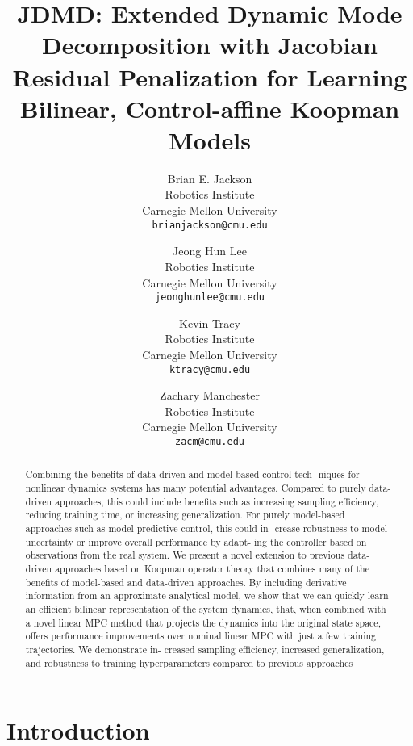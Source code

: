 \documentclass{article}
\title{JDMD: Extended Dynamic Mode Decomposition with Jacobian Residual Penalization
for Learning Bilinear, Control-affine Koopman Models}
\author{
Brian E. Jackson \\
Robotics Institute \\
Carnegie Mellon University\\
\texttt{brianjackson@cmu.edu} \\
\and
Jeong Hun Lee \\
Robotics Institute\\
Carnegie Mellon University\\
\texttt{jeonghunlee@cmu.edu} \\
\and
Kevin Tracy \\
Robotics Institute\\
Carnegie Mellon University\\
\texttt{ktracy@cmu.edu} \\
\and
Zachary Manchester \\
Robotics Institute\\
Carnegie Mellon University\\
\texttt{zacm@cmu.edu} \\
}
\begin{document}
\maketitle

\begin{abstract}
  Combining the benefits of data-driven and model-based control tech- niques for nonlinear
  dynamics systems has many potential advantages. Compared to purely data-driven approaches,
  this could include benefits such as increasing sampling efficiency, reducing training
  time, or increasing generalization. For purely model-based approaches such as
  model-predictive control, this could in- crease robustness to model uncertainty or improve
  overall performance by adapt- ing the controller based on observations from the real
  system. We present a novel extension to previous data-driven approaches based on Koopman
  operator theory that combines many of the benefits of model-based and data-driven
  approaches.  By including derivative information from an approximate analytical model, we
  show that we can quickly learn an efficient bilinear representation of the system
  dynamics, that, when combined with a novel linear MPC method that projects the dynamics
  into the original state space, offers performance improvements over nominal linear MPC
  with just a few training trajectories. We demonstrate in- creased sampling efficiency,
  increased generalization, and robustness to training hyperparameters compared to previous
  approaches
\end{abstract}

\section{Introduction}
\end{document}
